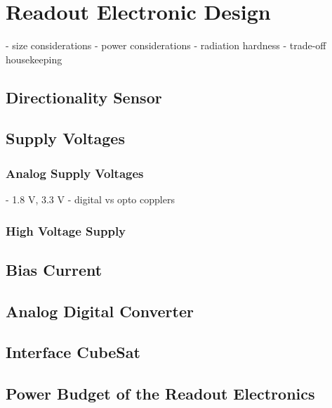 \section{Readout Electronic Design}
\label{sec:electronic_design}
- size considerations
- power considerations
- radiation hardness
- trade-off housekeeping

\subsection{Directionality Sensor}
\label{sec:directionality Sensor}


\subsection{Supply Voltages}
\label{sec:power_supplies}

\subsubsection{Analog Supply Voltages}
\label{sec:analog_supply}
- 1.8 V, 3.3 V
- digital vs opto copplers

\subsubsection{High Voltage Supply}
\label{sec:hv_supply}


\subsection{Bias Current}
\label{sec:bias_current}


\subsection{Analog Digital Converter}
\label{sec:adc}


\subsection{Interface CubeSat}
\label{sec:interface_cubesat}


\subsection{Power Budget of the Readout Electronics}
\label{sec:power_budget}
